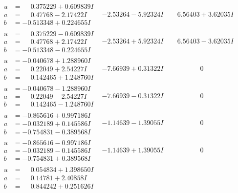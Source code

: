 \documentclass[1p]{elsarticle_modified}
\theoremstyle{definition}
\begin{document}
$$\begin{array}{c|c|c}
\begin{aligned}
u &= \phantom{-}0.375229 + 0.609839 I \\
a &= \phantom{-}0.47768 - 2.17422 I \\
b &= -0.513348 + 0.224655 I\end{aligned}
 & -2.53264 - 5.92324 I & \phantom{-}6.56403 + 3.62035 I \\ \hline\begin{aligned}
u &= \phantom{-}0.375229 - 0.609839 I \\
a &= \phantom{-}0.47768 + 2.17422 I \\
b &= -0.513348 - 0.224655 I\end{aligned}
 & -2.53264 + 5.92324 I & \phantom{-}6.56403 - 3.62035 I \\ \hline\begin{aligned}
u &= -0.040678 + 1.288960 I \\
a &= \phantom{-}0.22049 + 2.54227 I \\
b &= \phantom{-}0.142465 + 1.248760 I\end{aligned}
 & -7.66939 + 0.31322 I & \phantom{-0.000000 } 0 \\ \hline\begin{aligned}
u &= -0.040678 - 1.288960 I \\
a &= \phantom{-}0.22049 - 2.54227 I \\
b &= \phantom{-}0.142465 - 1.248760 I\end{aligned}
 & -7.66939 - 0.31322 I & \phantom{-0.000000 } 0 \\ \hline\begin{aligned}
u &= -0.865616 + 0.997186 I \\
a &= -0.032189 + 0.145586 I \\
b &= -0.754831 - 0.389568 I\end{aligned}
 & -1.14639 - 1.39055 I & \phantom{-0.000000 } 0 \\ \hline\begin{aligned}
u &= -0.865616 - 0.997186 I \\
a &= -0.032189 - 0.145586 I \\
b &= -0.754831 + 0.389568 I\end{aligned}
 & -1.14639 + 1.39055 I & \phantom{-0.000000 } 0 \\ \hline\begin{aligned}
u &= \phantom{-}0.054834 + 1.398650 I \\
a &= \phantom{-}0.14781 + 2.40858 I \\
b &= \phantom{-}0.844242 + 0.251626 I\end{aligned}

\end{array}$$
\end{document}
